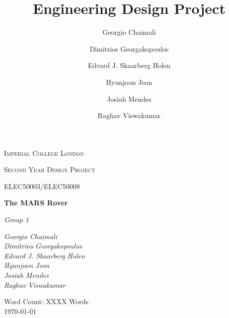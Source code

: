 \documentclass[a4paper]{article}
\title{Engineering Design Project}
\author{Georgio Chaimali \and 
        Dimitrios Georgakopoulos \and 
        Edvard J. Skaarberg Holen \and 
        Hyunjoon Jeon \and 
        Josiah Mendes \and 
        Raghav Viswakumar}
\begin{document}
 
\begin{titlepage}
    \setlength{\headheight}{66.89pt}
    \thispagestyle{fancy}
    \renewcommand{\headrulewidth}{0pt}
    \renewcommand{\footrulewidth}{0pt}
    \cfoot{} %
    \hbox{}\vfill
    \begin{center} 
	    {\scshape\LARGE Imperial College London  \par}
	    \vspace{1cm}
        {\scshape\Large Second Year Design Project\par}
        \vspace{0.25cm}
        {\scshape\Large ELEC50003/ELEC50008\par}
        \vspace{1.5cm}
        {\huge\bfseries The MARS Rover\par}
        \vspace{2cm}
        {\Large\itshape Group 1\par}
        \vfill
        \begin{flushright}
            \textsl{ \large
            Georgio Chaimali \\ 
            Dimitrios Georgakopoulos \\ 
            Edvard J. Skaarberg Holen \\ 
            Hyunjoon Jeon \\ 
            Josiah Mendes \\ 
            Raghav Viswakumar
            }
        \end{flushright}
        \vfill

        {\large Word Count: XXXX Words \\ \today\par}
    \end{center}
\end{titlepage}
 

\tableofcontents

\newpage
\end{document}
